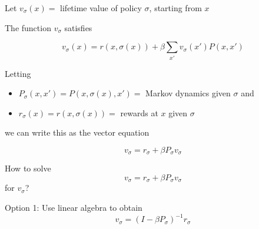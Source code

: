 \documentclass[xcolor=dvipsnames]{beamer}
\newcommand{\1}{\mathbbm 1}
\begin{document}
\begin{frame}

     Let $v_\sigma(x) =$ lifetime value of policy $\sigma$, starting from $x$

    \vspace{0.5em}
    The function $v_\sigma$ satisfies
    
    \begin{equation*}
        v_\sigma(x) = r(x, \sigma(x)) + \beta \sum_{x'} v_\sigma(x')P(x, x')
    \end{equation*}

    Letting
    \begin{itemize}
        \item $P_\sigma(x, x') = P(x, \sigma(x), x') =$ Markov dynamics given
            $\sigma$ and
        \vspace{0.5em}
        \item $r_\sigma(x) = r(x, \sigma(x)) = $ rewards at $x$ given $\sigma$
    \end{itemize}

    we can write this as the vector equation

    \begin{equation*}
        v_\sigma = r_\sigma + \beta P_\sigma v_\sigma
    \end{equation*}


\end{frame}

\begin{frame}
    
    How to solve
    \begin{equation*}
        v_\sigma = r_\sigma + \beta P_\sigma v_\sigma
    \end{equation*}
    for $v_\sigma$?

        \vspace{0.5em}
        \vspace{0.5em}
    Option 1: Use linear algebra to obtain
    \begin{equation*}
        v_\sigma = (I - \beta P_\sigma)^{-1}  r_\sigma
    \end{equation*}

\end{frame}
\end{document}
